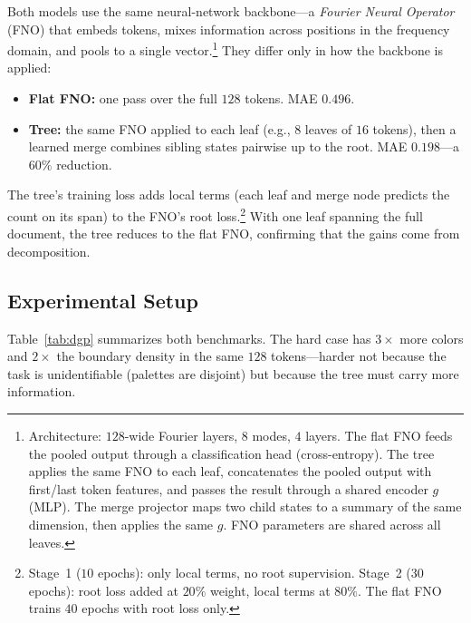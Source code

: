 Both models use the same neural-network backbone---a \emph{Fourier Neural Operator} (FNO) that embeds tokens, mixes information across positions in the frequency domain, and pools to a single vector.\footnote{Architecture: $128$-wide Fourier layers, $8$ modes, $4$ layers. The flat FNO feeds the pooled output through a classification head (cross-entropy). The tree applies the same FNO to each leaf, concatenates the pooled output with first/last token features, and passes the result through a shared encoder $g$ (MLP). The merge projector maps two child states to a summary of the same dimension, then applies the same $g$. FNO parameters are shared across all leaves.} They differ only in how the backbone is applied:

\begin{itemize}[leftmargin=1.5em]
    \item \textbf{Flat FNO:} one pass over the full $128$ tokens. MAE $0.496$.
    \item \textbf{Tree:} the same FNO applied to each leaf (e.g., $8$ leaves of $16$ tokens), then a learned merge combines sibling states pairwise up to the root. MAE $0.198$---a $60\%$ reduction.
\end{itemize}

The tree's training loss adds local terms (each leaf and merge node predicts the count on its span) to the FNO's root loss.\footnote{Stage~1 ($10$ epochs): only local terms, no root supervision. Stage~2 ($30$ epochs): root loss added at $20\%$ weight, local terms at $80\%$. The flat FNO trains $40$ epochs with root loss only.} With one leaf spanning the full document, the tree reduces to the flat FNO, confirming that the gains come from decomposition.


\subsection{Experimental Setup}\label{sec:experiment-setup}

Table~\ref{tab:dgp} summarizes both benchmarks. The hard case has $3{\times}$ more colors and $2{\times}$ the boundary density in the same $128$ tokens---harder not because the task is unidentifiable (palettes are disjoint) but because the tree must carry more information.

